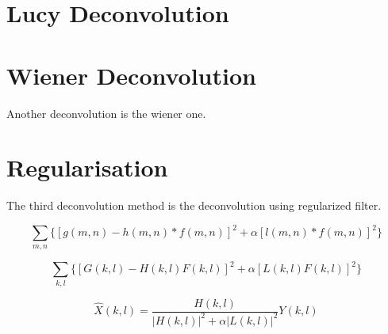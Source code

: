 \section{Lucy Deconvolution}



\section{Wiener Deconvolution}
 Another deconvolution is the wiener one. 




\section{Regularisation}
The third deconvolution method is the deconvolution using regularized filter. 

\begin{equation}
\sum_{m,n} \{ [g(m,n) - h(m,n)*f(m,n)]^2 + \alpha [l(m,n)*f(m,n)]^2\}
\end{equation}

\begin{equation}
\sum_{k,l} \{ [G(k,l) - H(k,l)F(k,l)]^2 + \alpha [L(k,l)F(k,l)]^2\}
\end{equation}


\begin{equation}
\hat{X}(k,l) = \frac{H(k,l)}{|H(k,l)|^2 + \alpha |L(k,l)|^2} Y(k,l)
\end{equation}